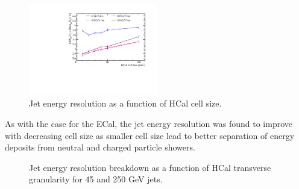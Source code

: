 \begin{figure}
\centering
\includegraphics[width=0.5\textwidth]{OptimisationStudies/Plots/JetEnergyResolutions/JER_vs_HCalCellSize.pdf}
\caption[Jet energy resolution as a function of HCal cell size.]{Jet energy resolution as a function of HCal cell size.}
\label{fig:hcalcellsize}
\end{figure}

As with the case for the ECal, the jet energy resolution was found to improve with decreasing cell size as smaller cell size lead to better separation of energy deposits from neutral and charged particle showers.

\begin{figure}
\centering
{}
\caption[Jet energy resolution breakdown as a function of HCal transverse granularity for 45 and 250 GeV jets.]{Jet energy resolution breakdown as a function of HCal transverse granularity for 45 and 250 GeV jets.}
\label{fig:hcalcellsizebreak}
\end{figure}

